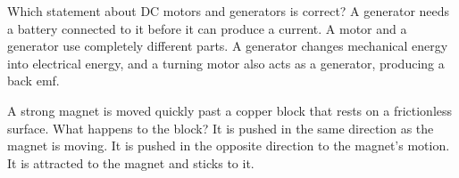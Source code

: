 \begin{quizq}{}
Which statement about DC motors and generators is correct?
  {A generator needs a battery connected to it before it can produce a current.}
  {A motor and a generator use completely different parts.}
  {A generator changes mechanical energy into electrical energy, and a turning motor also acts as a
   generator, producing a back emf.}
\end{quizq}

\begin{quizq}{}
A strong magnet is moved quickly past a copper block that rests on a frictionless surface. What
happens to the block?
  {It is pushed in the same direction as the magnet is moving.}
  {It is pushed in the opposite direction to the magnet's motion.}
  {It is attracted to the magnet and sticks to it.}
\end{quizq}
